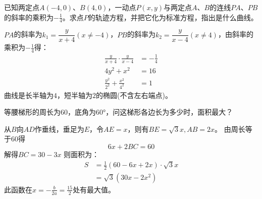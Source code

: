 \documentclass[answers]{exam}
\begin{document}
\begin{questions}
\begin{solution}
\begin{enumerate}[label=\Roman*.]
		\end{enumerate}
	\end{solution}

	\question
	已知两定点$A(-4,0)$、$B(4,0)$，一动点$P(x,y)$与两定点$A$、$B$的连线$PA$、$PB$的斜率的乘积为$-\frac14$。求点$P$的轨迹方程，并把它化为标准方程，指出是什么曲线。
	\begin{solution}
		$PA$的斜率为$k_1 = \dfrac{y}{x+4}(x \neq -4)$，$PB$的斜率为$k_2 = \dfrac{y}{x-4}(x \neq 4)$，由斜率的乘积为$-\frac14$得：
		\begin{align*}
			\frac{y}{x+4}\cdot\frac{y}{x-4}   & = -\frac14 \\
			4y^2 + x^2                        & = 16       \\
			\frac{y^2}{2^2} + \frac{x^2}{4^2} & = 1
		\end{align*}
		曲线是长半轴为$4$，短半轴为$2$的椭圆(不含左右端点)。
	\end{solution}

	\question 等腰梯形的周长为$60$，底角为\ang{60}，问这梯形各边长为多少时，面积最大？
	\begin{figure*}[ht]
		\centering
	\end{figure*}

	\begin{solution}
		从$B$向$AD$作垂线，垂足为$E$，令$AE=x$，则有$BE=\sqrt{3}x, AB=2x$。
		由周长等于$60$得
		\begin{equation*}
			6x + 2BC = 60
		\end{equation*}
		解得$BC = 30 - 3x$
		则面积为：
		\begin{align*}
			S & = \frac12(60-6x + 2x)\cdot\sqrt{3}x \\
			  & = \sqrt{3}(30x - 2x^2)
		\end{align*}
		此函数在$x=-\frac{b}{2a} = \frac{15}{2}$处有最大值。


\end{solution}
\end{questions}
\end{document}
